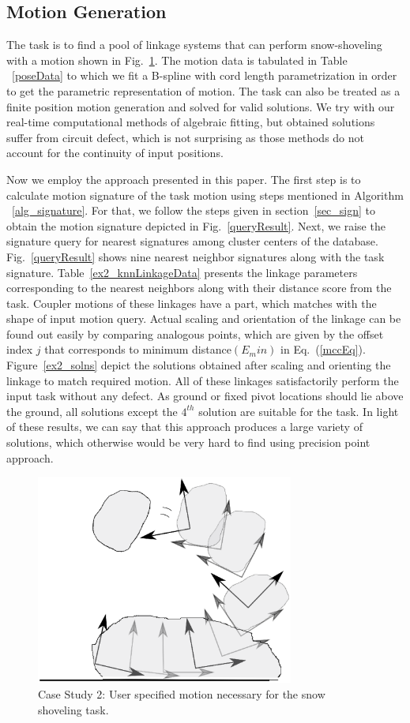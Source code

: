 \documentclass[twocolumn,10pt]{asme2e}
\newcommand{\req}[1]{(\ref{#1})}
\begin{document}
\subsection{Motion Generation}
The task is to find a pool of linkage systems that can perform snow-shoveling with a motion shown in Fig.~\ref{motionQuery}.
The motion data is tabulated in Table ~\ref{poseData} to which we fit a B-spline with cord length parametrization in order to get the parametric representation of motion.
The task can also be treated as a finite position motion generation and solved for valid solutions.
We try with our real-time computational methods of algebraic fitting\cite{generalfitting-JCISE},\cite{shrinathpurwar2017} but obtained solutions suffer from circuit defect, which is not surprising as those methods do not account for the continuity of input positions.

Now we employ the approach presented in this paper.
The first step is to calculate motion signature of the task motion using steps mentioned in Algorithm ~\ref{alg_signature}.
For that, we follow the steps given in section~\ref{sec_sign} to obtain the motion signature depicted in Fig.~\ref{queryResult}.
Next, we raise the signature query for nearest signatures among cluster centers of the database.
Fig.~\ref{queryResult} shows nine nearest neighbor signatures along with the task signature.
Table~\ref{ex2_knnLinkageData} presents the linkage parameters corresponding to the nearest neighbors along with their distance score from the task.
Coupler motions of these linkages have a part, which matches with the shape of input motion query.
Actual scaling and orientation of the linkage can be found out easily by comparing analogous points, which are given by the offset index $j$ that corresponds to minimum distance$(E_min)$ in Eq.~\req{mccEq}.
Figure~\ref{ex2_solns} depict the solutions obtained after scaling and orienting the linkage to match required motion.
All of these linkages satisfactorily perform the input task without any defect.
As ground or fixed pivot locations should lie above the ground, all solutions except the $4^{th}$ solution are suitable for the task.
In light of these results, we can say that this approach produces a large variety of solutions, which otherwise would be very hard to find using precision point approach.

\begin{figure}
\centering
\includegraphics[width=240pt]{figure/fig_motion_query.eps}
  \caption{Case Study 2: User specified motion necessary for the snow shoveling task.}
\label{motionQuery}
\end{figure}
\end{document}
